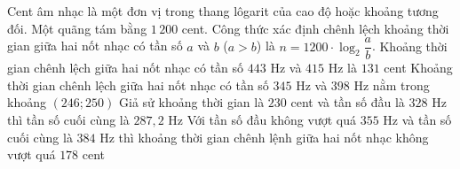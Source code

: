 \begin{ex}%
 Cent âm nhạc là một đơn vị trong thang lôgarit của cao độ hoặc khoảng tương đối. Một quãng  tám bằng $1\,200$ cent. Công thức xác định chênh lệch khoảng thời gian giữa hai nốt nhạc có tần số $a$ và $b$ ($a > b$) là $n=1200\cdot\log_2 \dfrac{a}{b}$.
  \choiceTF
  {Khoảng thời gian chênh lệch giữa hai nốt nhạc có tần số $443$ Hz và $415$ Hz là  $131$ cent}
  {\True Khoảng thời gian chênh lệch giữa hai nốt  nhạc có tần số $345$ Hz và $398$ Hz nằm trong khoảng $\left(246;250\right)$}
   {\True Giả sử khoảng thời gian là $230$ cent và tần số đầu là $328$ Hz thì tần số cuối cùng là $287{,}2$ Hz}
  {Với tần số đầu không vượt quá $355$ Hz  và tần số cuối cùng là $384$ Hz thì khoảng thời gian chênh lệnh giữa hai nốt nhạc không vượt quá $178$ cent}
\end{ex}


